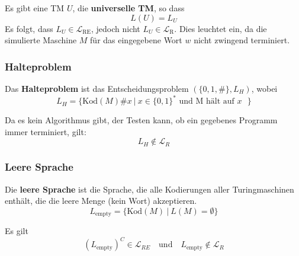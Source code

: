 \documentclass[11pt]{article}
\begin{document}
Es gibt eine TM $U$, die \textbf{universelle TM}, so dass
\begin{equation*}
	L(U) = L_U
\end{equation*}
Es folgt, dass $L_U \in \mathcal{L}_\text{RE}$, jedoch nicht $L_U \in \mathcal{L}_\text{R}$. Dies leuchtet ein, da die simulierte Maschine $M$ f{\"u}r das eingegebene Wort $w$ nicht zwingend terminiert.

\subsubsection{Halteproblem}

Das \textbf{Halteproblem} ist das Entscheidungsproblem $(\{0, 1, \#\}, L_H)$, wobei
\begin{equation*}
	L_H = \{\text{Kod}(M)\#x\ |\ x \in \{0,1\}^* \text{ und M h{\"a}lt auf $x$ }\}
\end{equation*}

Da es kein Algorithmus gibt, der Testen kann, ob ein gegebenes Programm immer terminiert, gilt:
\begin{equation*}
	L_H \not\in \mathcal{L}_R
\end{equation*}

\subsubsection{Leere Sprache}

Die \textbf{leere Sprache} ist die Sprache, die alle Kodierungen aller Turingmaschinen enth{\"a}lt, die die leere Menge (kein Wort) akzeptieren.
\begin{equation*}
	L_\text{empty} = \{\text{Kod}(M)\ |\ L(M) = \emptyset\}
\end{equation*}

Es gilt
\begin{equation*}
	(L_\text{empty})^C \in \mathcal{L}_{RE} \quad\text{und}\quad L_\text{empty} \not\in \mathcal{L}_{R}
\end{equation*}
\end{document}
